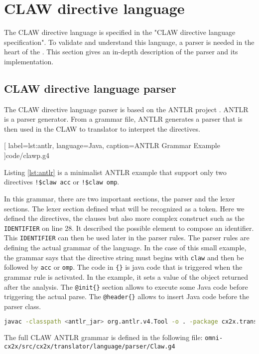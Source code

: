 \chapter{CLAW directive language}
The CLAW directive language is specified in the "CLAW directive language
specification"\cite{claw:specification}. To validate and understand this 
language, a parser is needed in the heart of the \clawfcomp. This section
gives an in-depth description of the parser and its implementation.

\section{CLAW directive language parser}
The CLAW directive language parser is based on the ANTLR project
\cite{Parr:2013:DAR:2501720}. ANTLR is a parser generator. From a grammar file,
ANTLR generates a parser that is then used in the CLAW \xcodeml to \xcodeml
translator to interpret the directives.


  [
    label=lst:antlr,
    language=Java,
    caption=ANTLR Grammar Example
  ]{code/clawp.g4}

Listing \ref{lst:antlr} is a minimalist ANTLR example that support only two
directives \lstinline|!$claw acc| or \lstinline|!$claw omp|.

In this grammar, there are two important sections, the parser and the lexer
sections. The lexer section defined what will be recognized as a token. Here
we defined the directives, the clauses but also more complex construct such as
the \lstinline|IDENTIFIER| on line 28. It described the possible element to
compose an identifier. This \lstinline|IDENTIFIER| can then be used later in
the parser rules.
The parser rules are defining the actual grammar of the language. In the case
of this small example, the grammar says that the directive string must begins
with \lstinline|claw| and then be followed by \lstinline|acc| or
\lstinline|omp|. The code in \lstinline|{}| is java code that is triggered
when the grammar rule is activated. In the example, it sets a value of the
object returned after the analysis.
The \lstinline|@init{}| section allows to execute some Java code before
triggering the actual parse. The \lstinline|@header{}| allows to insert Java
code before the parser class.

\begin{lstlisting}[label=lst:antlr_cmd, caption=ANTLR parser generation command, language=bash]
javac -classpath <antlr_jar> org.antlr.v4.Tool -o . -package cx2x.translator.language.parser Claw.g4
\end{lstlisting}

The full CLAW ANTLR grammar is defined in the following file:
\lstinline|omni-cx2x/src/cx2x/translator/language/parser/Claw.g4|
